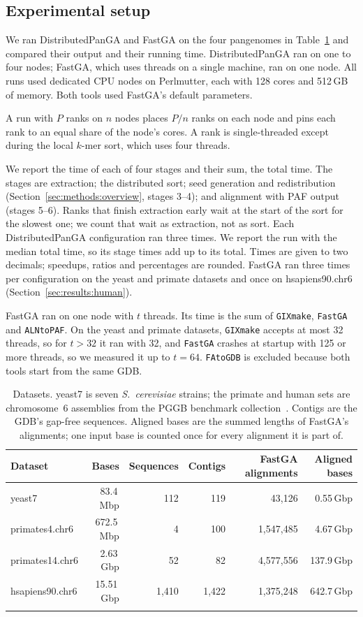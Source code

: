 \subsection{Experimental setup}\label{sec:results:setup}

We ran DistributedPanGA and FastGA on the four pangenomes in
Table~\ref{tab:datasets} and compared their output and their running time.
DistributedPanGA ran on one to four nodes; FastGA, which uses threads on a
single machine, ran on one node. All runs used dedicated CPU nodes on Perlmutter,
each with 128 cores and 512\,GB of memory. Both tools used FastGA's default parameters.

A run with $P$ ranks on $n$ nodes places
$P/n$ ranks on each node and pins each rank to an equal share of the node's
cores. A rank is single-threaded except during the local $k$-mer sort, which
uses four threads.

We report the time of each of four stages and their sum, the total time.
The stages are extraction; the distributed sort; seed generation and
redistribution (Section~\ref{sec:methods:overview}, stages 3--4); and
alignment with PAF output (stages 5--6). Ranks that finish extraction
early wait at the start of the sort for the slowest one; we count that wait
as extraction, not as sort. Each DistributedPanGA configuration ran three times. We report the run
with the median total time, so its stage times add up to its total. Times
are given to two decimals; speedups, ratios and percentages are rounded.
FastGA ran three times per configuration on the yeast and primate datasets
and once on hsapiens90.chr6 (Section~\ref{sec:results:human}).

FastGA ran on one node with $t$ threads. Its time is the sum of
\texttt{GIXmake}, \texttt{FastGA} and \texttt{ALNtoPAF}. On the yeast and
primate datasets, \texttt{GIXmake} accepts at most 32 threads, so for
$t>32$ it ran with 32, and \texttt{FastGA} crashes at startup with 125 or
more threads, so we measured it up to $t=64$. \texttt{FAtoGDB} is excluded because both tools
start from the same GDB.

\begin{table}[htbp]
\caption{Datasets. yeast7 is seven \textit{S.~cerevisiae} strains; the
primate and human sets are chromosome~6 assemblies from the PGGB benchmark
collection~\cite{pggbdata}. Contigs are the GDB's gap-free sequences.
Aligned bases are the summed lengths of FastGA's alignments; one input base
is counted once for every alignment it is part of.}\label{tab:datasets}
\begin{tabular}{@{}lrrrrr@{}}
\toprule
Dataset & Bases & Sequences & Contigs & FastGA alignments & Aligned bases \\
\midrule
yeast7 & 83.4\,Mbp & 112 & 119 & 43,126 & 0.55\,Gbp \\
primates4.chr6 & 672.5\,Mbp & 4 & 100 & 1,547,485 & 4.67\,Gbp \\
primates14.chr6 & 2.63\,Gbp & 52 & 82 & 4,577,556 & 137.9\,Gbp \\
hsapiens90.chr6 & 15.51\,Gbp & 1,410 & 1,422 & 1,375,248 & 642.7\,Gbp \\
\botrule
\end{tabular}
\end{table}
